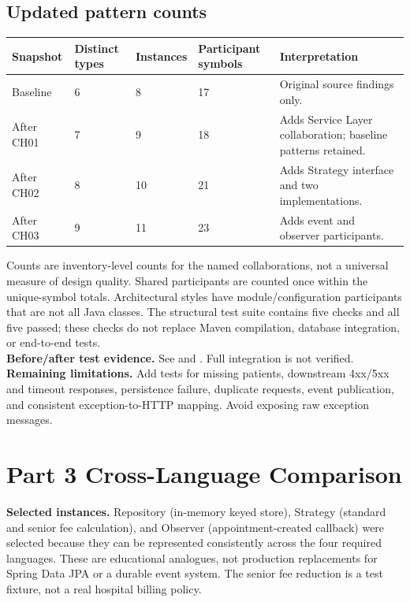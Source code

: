 \documentclass[11pt,a4paper]{article}
\begin{document}
\subsection{Updated pattern counts}
\begin{tabularx}{\linewidth}{@{}p{1.1in}p{1.2in}p{1.2in}p{1.0in}Y@{}}
\toprule\textbf{Snapshot} & \textbf{Distinct types} & \textbf{Instances} & \textbf{Participant symbols} & \textbf{Interpretation}\\\midrule
Baseline & 6 & 8 & 17 & Original source findings only.\\
After CH01 & 7 & 9 & 18 & Adds Service Layer collaboration; baseline patterns retained.\\
After CH02 & 8 & 10 & 21 & Adds Strategy interface and two implementations.\\
After CH03 & 9 & 11 & 23 & Adds event and observer participants.\\
\bottomrule
\end{tabularx}

Counts are inventory-level counts for the named collaborations, not a universal measure of design quality. Shared participants are counted once within the unique-symbol totals. Architectural styles have module/configuration participants that are not all Java classes. The structural test suite contains five checks and all five passed; these checks do not replace Maven compilation, database integration, or end-to-end tests.\\
\textbf{Before/after test evidence.} See  and . Full integration is not verified.\\
\textbf{Remaining limitations.} Add tests for missing patients, downstream 4xx/5xx and timeout responses, persistence failure, duplicate requests, event publication, and consistent exception-to-HTTP mapping. Avoid exposing raw exception messages.

\section{Part 3 Cross-Language Comparison}
\textbf{Selected instances.} Repository (in-memory keyed store), Strategy (standard and senior fee calculation), and Observer (appointment-created callback) were selected because they can be represented consistently across the four required languages. These are educational analogues, not production replacements for Spring Data JPA or a durable event system. The senior fee reduction is a test fixture, not a real hospital billing policy.
\end{document}
